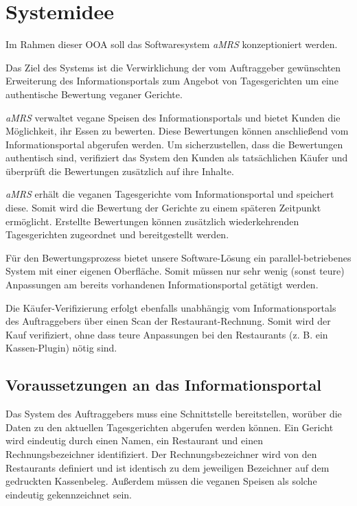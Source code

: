 \section{Systemidee}

Im Rahmen dieser \ac{OOA} soll das Softwaresystem \textit{\ac{aMRS}} konzeptioniert werden.

Das Ziel des Systems ist die Verwirklichung der vom Auftraggeber gewünschten Erweiterung des Informationsportals zum Angebot von Tagesgerichten um eine authentische Bewertung veganer Gerichte. 

\textit{\ac{aMRS}} verwaltet vegane Speisen des Informationsportals und bietet Kunden die Möglichkeit, ihr Essen zu bewerten.
Diese Bewertungen können anschließend vom Informationsportal abgerufen werden.
Um sicherzustellen, dass die Bewertungen authentisch sind, verifiziert das System den Kunden als tatsächlichen Käufer und überprüft die Bewertungen zusätzlich auf ihre Inhalte.

\textit{\ac{aMRS}} erhält die veganen Tagesgerichte vom Informationsportal und speichert diese.
Somit wird die Bewertung der Gerichte zu einem späteren Zeitpunkt ermöglicht.
Erstellte Bewertungen können zusätzlich wiederkehrenden Tagesgerichten zugeordnet und bereitgestellt werden. 

Für den Bewertungsprozess bietet unsere Software-Lösung ein parallel-betriebenes System mit einer eigenen Oberfläche.
Somit müssen nur sehr wenig (sonst teure) Anpassungen am bereits vorhandenen Informationsportal getätigt werden. 

Die Käufer-Verifizierung erfolgt ebenfalls unabhängig vom Informationsportals des Auftraggebers über einen Scan der Restaurant-Rechnung.
Somit wird der Kauf verifiziert, ohne dass teure Anpassungen bei den Restaurants (z. B. ein Kassen-Plugin) nötig sind.

\subsection*{Voraussetzungen an das Informationsportal}

Das System des Auftraggebers muss eine Schnittstelle bereitstellen, worüber die Daten zu den aktuellen Tagesgerichten abgerufen werden können.
Ein Gericht wird eindeutig durch einen Namen, ein Restaurant und einen Rechnungsbezeichner identifiziert.
Der Rechnungsbezeichner wird von den Restaurants definiert und ist identisch zu dem jeweiligen Bezeichner auf dem gedruckten Kassenbeleg.
Außerdem müssen die veganen Speisen als solche eindeutig gekennzeichnet sein.


